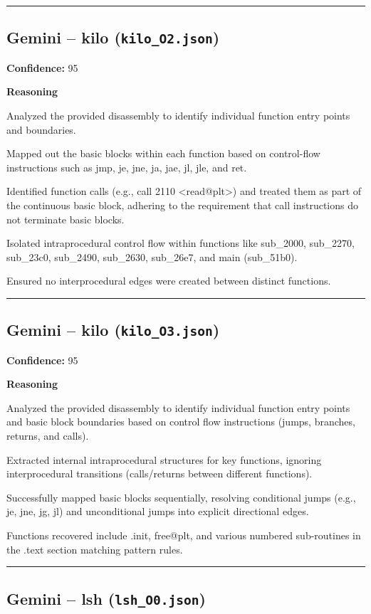 \bigskip
\hrule
\bigskip

\subsection{Gemini -- kilo (\texttt{kilo\_O2.json})}

\textbf{Confidence:} 95

\textbf{Reasoning}

Analyzed the provided disassembly to identify individual function entry points and boundaries.

Mapped out the basic blocks within each function based on control-flow instructions such as jmp, je, jne, ja, jae, jl, jle, and ret.

Identified function calls (e.g., call 2110 <read@plt>) and treated them as part of the continuous basic block, adhering to the requirement that call instructions do not terminate basic blocks.

Isolated intraprocedural control flow within functions like sub\_2000, sub\_2270, sub\_23c0, sub\_2490, sub\_2630, sub\_26e7, and main (sub\_51b0).

Ensured no interprocedural edges were created between distinct functions.

\bigskip
\hrule
\bigskip

\subsection{Gemini -- kilo (\texttt{kilo\_O3.json})}

\textbf{Confidence:} 95

\textbf{Reasoning}

Analyzed the provided disassembly to identify individual function entry points and basic block boundaries based on control flow instructions (jumps, branches, returns, and calls).

Extracted internal intraprocedural structures for key functions, ignoring interprocedural transitions (calls/returns between different functions).

Successfully mapped basic blocks sequentially, resolving conditional jumps (e.g., je, jne, jg, jl) and unconditional jumps into explicit directional edges.

Functions recovered include .init, free@plt, and various numbered sub-routines in the .text section matching pattern rules.

\bigskip
\hrule
\bigskip

\subsection{Gemini -- lsh (\texttt{lsh\_O0.json})}

